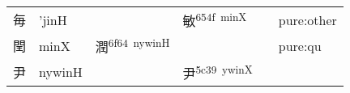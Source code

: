 \documentclass[14pt,a4paper]{scrartcl}
\begin{document}
\begin{longtable}[c]{@{}llllll@{}}
\begin{minipage}[t]{0.14\columnwidth}
毎
\strut\end{minipage} &
\begin{minipage}[t]{0.14\columnwidth}\raggedright\strut
'jinH
\strut\end{minipage} &
\begin{minipage}[t]{0.14\columnwidth}\raggedright\strut
\strut\end{minipage} &
\begin{minipage}[t]{0.14\columnwidth}\raggedright\strut
敏\textsuperscript{654f~minX}
\strut\end{minipage} &
\begin{minipage}[t]{0.14\columnwidth}\raggedright\strut
\strut\end{minipage} &
\begin{minipage}[t]{0.14\columnwidth}\raggedright\strut
pure:other
\strut\end{minipage}\tabularnewline
\begin{minipage}[t]{0.14\columnwidth}\raggedright\strut
閏
\strut\end{minipage} &
\begin{minipage}[t]{0.14\columnwidth}\raggedright\strut
minX
\strut\end{minipage} &
\begin{minipage}[t]{0.14\columnwidth}\raggedright\strut
潤\textsuperscript{6f64~nywinH}
\strut\end{minipage} &
\begin{minipage}[t]{0.14\columnwidth}\raggedright\strut
\strut\end{minipage} &
\begin{minipage}[t]{0.14\columnwidth}\raggedright\strut
\strut\end{minipage} &
\begin{minipage}[t]{0.14\columnwidth}\raggedright\strut
pure:qu
\strut\end{minipage}\tabularnewline
\begin{minipage}[t]{0.14\columnwidth}\raggedright\strut
尹
\strut\end{minipage} &
\begin{minipage}[t]{0.14\columnwidth}\raggedright\strut
nywinH
\strut\end{minipage} &
\begin{minipage}[t]{0.14\columnwidth}\raggedright\strut
\strut\end{minipage} &
\begin{minipage}[t]{0.14\columnwidth}\raggedright\strut
尹\textsuperscript{5c39~ywinX}
\strut\end{minipage} &

\end{longtable}
\end{document}

